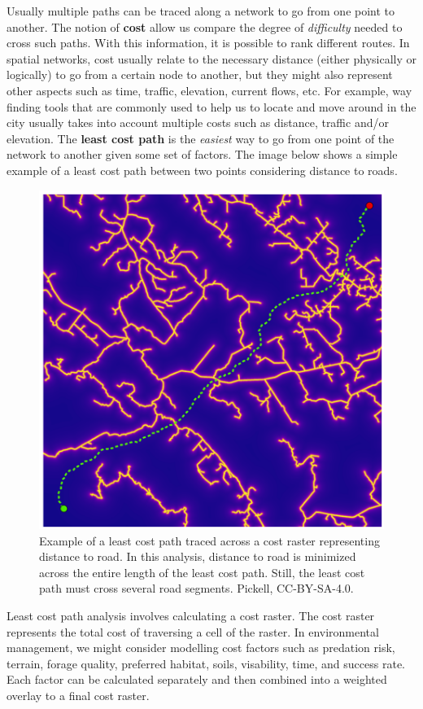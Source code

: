 \documentclass[
]{book}
\begin{document}
Usually multiple paths can be traced along a network to go from one point to another. The notion of \textbf{cost} allow us compare the degree of \emph{difficulty} needed to cross such paths. With this information, it is possible to rank different routes. In spatial networks, cost usually relate to the necessary distance (either physically or logically) to go from a certain node to another, but they might also represent other aspects such as time, traffic, elevation, current flows, etc. For example, way finding tools that are commonly used to help us to locate and move around in the city usually takes into account multiple costs such as distance, traffic and/or elevation. The \textbf{least cost path} is the \emph{easiest} way to go from one point of the network to another given some set of factors. The image below shows a simple example of a least cost path between two points considering distance to roads.

\begin{figure}
\includegraphics[width=0.75\linewidth]{images/08-least-cost-path} \caption{Example of a least cost path traced across a cost raster representing distance to road. In this analysis, distance to road is minimized across the entire length of the least cost path. Still, the least cost path must cross several road segments. Pickell, CC-BY-SA-4.0.}\label{fig:8-least-cost-path}
\end{figure}

Least cost path analysis involves calculating a cost raster. The cost raster represents the total cost of traversing a cell of the raster. In environmental management, we might consider modelling cost factors such as predation risk, terrain, forage quality, preferred habitat, soils, visability, time, and success rate. Each factor can be calculated separately and then combined into a weighted overlay to a final cost raster.
\end{document}

